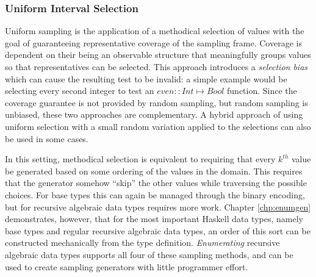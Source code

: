 \subsubsection{Uniform Interval Selection}
Uniform sampling is the application of a methodical selection of values
with the goal of guaranteeing representative coverage of the sampling frame.
Coverage is dependent on their being an observable structure
that meaningfully groups values so that representatives can be selected.
This approach introduces a \emph{selection bias} which can cause the resulting test to be invalid:
a simple example would be selecting every second integer to test an $even:: Int \mapsto Bool$ function.
Since the coverage guarantee is not provided by random sampling,
but random sampling is unbiased,
these two approaches are complementary.
A hybrid approach of using uniform selection with a small random variation applied to the selections can also be used in some cases.

In this setting, methodical selection is equivalent to 
requiring that every $k^{th}$ value be generated
based on some ordering of the values in the domain.
This requires that the generator somehow ``skip'' the other values
while traversing the possible choices.
For base types this can again be managed through the binary encoding,
but for recursive algebraic data types requires more work.
Chapter \ref{chp:enumgen} demonstrates, however,
that for the most  important Haskell data types,
namely base types and regular recursive algebraic data types,
an order of this sort can be constructed mechanically from the type definition.
\emph{Enumerating} recursive algebraic data types supports all four of these sampling methods,
and can be used to create sampling generators with little programmer effort.

